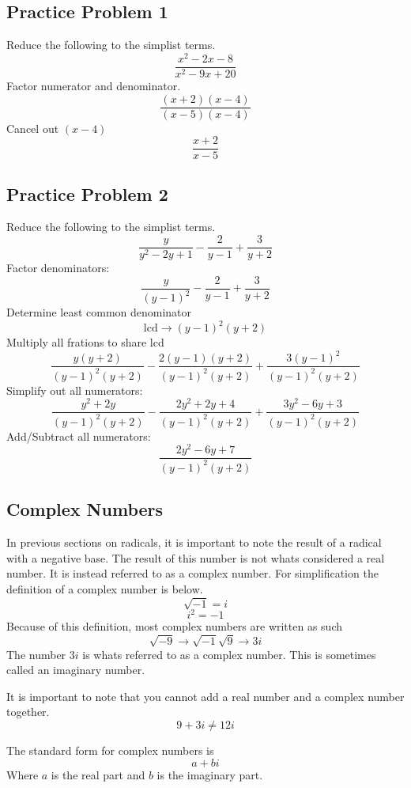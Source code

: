 \documentclass[12pt, letterpaper, oneside]{book}
\begin{document}
\subsection{Practice Problem 1}
Reduce the following to the simplist terms.
\[\frac{x^2-2x-8}{x^2-9x+20}\]
Factor numerator and denominator.
\[\frac{(x+2)(x-4)}{(x-5)(x-4)}\]
Cancel out $(x-4)$
\[\frac{x+2}{x-5}\]

\subsection{Practice Problem 2}
Reduce the following to the simplist terms.
\[\frac{y}{y^2-2y+1} - \frac{2}{y-1} + \frac{3}{y+2}\]
Factor denominators:
\[\frac{y}{(y-1)^2} - \frac{2}{y-1} + \frac{3}{y+2}\]
Determine least common denominator
\[\text{lcd} \rightarrow (y-1)^2(y+2)\]
Multiply all frations to share lcd
\[\frac{y(y+2)}{(y-1)^2(y+2)} - \frac{2(y-1)(y+2)}{(y-1)^2(y+2)} + \frac{3(y-1)^2}{(y-1)^2(y+2)}\]
Simplify out all numerators:
\[\frac{y^2+2y}{(y-1)^2(y+2)} - \frac{2y^2 + 2y + 4}{(y-1)^2(y+2)} + \frac{3y^2 - 6y +3}{(y-1)^2(y+2)}\]
Add/Subtract all numerators:
\[\frac{2y^2-6y+7}{(y-1)^2(y+2)}\]

\subsection{Complex Numbers}
In previous sections on radicals, it is important to note the result of a radical with a negative base. The result of this number is not whats considered a real number. It is instead referred to as a complex number. For simplification the definition of a complex number is below.
\begin{equation}
    \sqrt{-1} = i
\end{equation}
\begin{equation}
    i^2 = -1
\end{equation}
Because of this definition, most complex numbers are written as such
\[\sqrt{-9} \rightarrow \sqrt{-1}\sqrt{9} \rightarrow 3i \]
The number $3i$ is whats referred to as a complex number. This is sometimes called an imaginary number. 

It is important to note that you cannot add a real number and a complex number together. 
\[9 + 3i \neq 12i\]

The standard form for complex numbers is
\begin{equation}
    a + bi
\end{equation}
Where $a$ is the real part and $b$ is the imaginary part.
\end{document}
